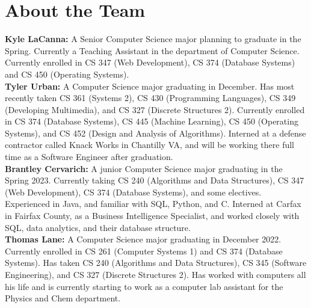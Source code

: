 \documentclass[11pt]{article}
\begin{document}
\section*{About the Team}


\textbf {Kyle LaCanna:} A Senior Computer Science major planning to graduate in the Spring. Currently a Teaching Assistant in the department of Computer Science. Currently enrolled in CS 347 (Web Development), CS 374 (Database Systems) and CS 450 (Operating Systems). \\

\noindent \ignorespacesafterend \textbf{Tyler Urban:} A Computer Science major graduating in December. Has most recently taken CS 361 (Systems 2), CS 430 (Programming Languages), CS 349 (Developing Multimedia), and CS 327 (Discrete Structures 2). Currently enrolled in CS 374 (Database Systems), CS 445 (Machine Learning), CS 450 (Operating Systems), and CS 452 (Design and Analysis of Algorithms). Interned at a defense contractor called Knack Works in Chantilly VA, and will be working there full time as a Software Engineer after graduation. \\

\noindent \ignorespacesafterend \textbf{Brantley Cervarich:} A junior Computer Science major graduating in the Spring 2023. Currently taking CS 240 (Algorithms and Data Structures), CS 347 (Web Development), CS 374 (Database Systems), and some electives. Experienced in Java, and familiar with SQL, Python, and C. Interned at Carfax in Fairfax County, as a Business Intelligence Specialist, and worked closely with SQL, data analytics, and their database structure. \\

\noindent \ignorespacesafterend \textbf{Thomas Lane:} A Computer Science major graduating in December 2022. Currently enrolled in CS 261 (Computer Systems 1) and CS 374 (Database Systems). Has taken CS 240 (Algorithms and Data Structures), CS 345 (Software Engineering), and CS 327 (Discrete Structures 2). Has worked with computers all his life and is currently starting to work as a computer lab assistant for the Physics and Chem department. \\
\end{document}
